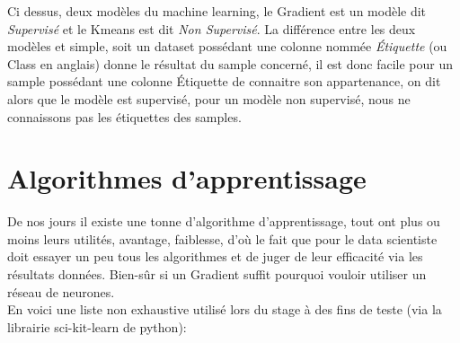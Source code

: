 Ci dessus, deux modèles du machine learning, le Gradient est un modèle dit \textit{Supervisé} et le Kmeans est dit \textit{Non Supervisé}. La différence entre les deux modèles et simple, soit un dataset possédant une colonne nommée \textit{Étiquette} (ou Class en anglais) donne le résultat du sample concerné, il est donc facile pour un sample possédant une colonne Étiquette de connaitre son appartenance, on dit alors que le modèle est supervisé, pour un modèle non supervisé, nous ne connaissons pas les étiquettes des samples.\\
\pagebreak

\section{Algorithmes d'apprentissage}

De nos jours il existe une tonne d'algorithme d'apprentissage, tout ont plus ou moins leurs utilités, avantage, faiblesse, d'où le fait que pour le data scientiste doit essayer un peu tous les algorithmes et de juger de leur efficacité via les résultats données. Bien-sûr si un Gradient suffit pourquoi vouloir utiliser un réseau de neurones.\\
En voici une liste non exhaustive utilisé lors du stage à des fins de teste (via la librairie sci-kit-learn de python):


